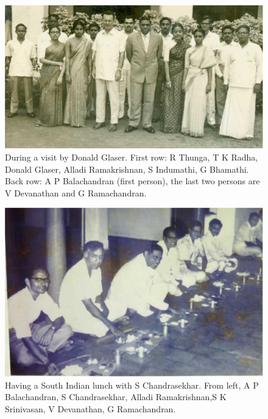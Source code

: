 \begin{figure}[H]
\centering
\includegraphics[scale=0.34]{src/images/chap25/4.eps}
\caption{During a visit by Donald Glaser. First row: R Thunga,
T K Radha, Donald Glaser, Alladi Ramakrishnan, S Indumathi, 
G Bhamathi. Back row: A P Balachandran (first person), the last two persons are V Devanathan and G Ramachandran.}
\end{figure}
\medskip

\begin{figure}[H]
\centering
\includegraphics[scale=0.34]{src/images/chap25/5.eps}
\caption{Having a South Indian lunch with S Chandrasekhar. From left, A P
Balachandran, S Chandrasekhar, Alladi Ramakrishnan,\break S K Srinivasan, V Devanathan, G
Ramachandran.}
\end{figure}

